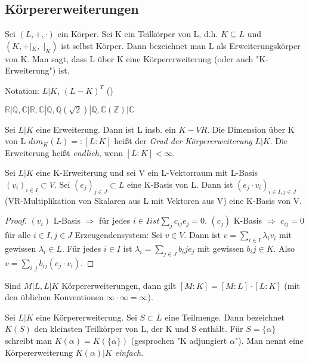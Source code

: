\documentclass[../main.tex]{subfiles}
\begin{document}
\subsection{Körpererweiterungen}
\begin{definition}[Körpererweiterung]
    Sei $(L, +, \cdot)$ ein Körper. Sei K ein Teilkörper von L, d.h. $K \subseteq L$ und $(K,+|_K,\cdot|_K)$ ist selbst Körper. Dann bezeichnet man L als Erweiterungskörper von K. Man sagt, dass L über K eine Körpererweiterung (oder auch "K-Erweiterung") ist. 

    Notation: $L | K$, $(L - K)^T$ ()
\end{definition}
\begin{example*} $\mathbb{R}|\mathbb{Q}, \mathbb{C}|\mathbb{R},\mathbb{C}|\mathbb{Q},\mathbb{Q}(\sqrt{2}) | \mathbb{Q}, \mathbb{C}(\mathbb{Z}) | \mathbb{C}$ \end{example*}
\begin{definition}
    Sei $L | K$ eine Erweiterung. Dann ist L insb. ein $K-VR$. Die Dimension über K von L $dim_K(L) =: [L:K]$ heißt der \emph{Grad der Körpererweiterung} $L | K$. Die Erweiterung heißt \emph{endlich}, wenn $[L:K] < \infty$.
\end{definition}
\begin{lemma}
    Sei $L | K$ eine K-Erweiterung und sei V ein L-Vektorraum mit L-Basis $(v_i)_{i \in I} \subset V$. Sei $(e_j)_{j \in J} \subset L$ eine K-Basis von L. Dann ist $(e_j \cdot v_i)_{i \in I, j \in J}$ (VR-Multiplikation von Skalaren aus L mit Vektoren aus V) eine K-Basis von V.
\end{lemma}
\begin{proof}
$(v_i)$ L-Basis $\Rightarrow$ für jedes $i \in I ist \sum_j c_{ij}e_j = 0$. $(c_j)$ K-Basis $\Rightarrow$ $c_{ij} = 0$ für alle $i \in I, j \in J$
Erzeugendensystem: Sei $v \in V$.
Dann ist $v = \sum_{i \in I} \lambda_iv_i$ mit gewissen $\lambda_i \in L$. Für jedes $i \in I$ ist $\lambda_i = \sum_{j \in J} b_ije_j$ mit gewissen $b_ij \in K$. Also $v = \sum_{i,j} b_{ij}(e_j \cdot v_i)$.
\end{proof}
\begin{lemma}[Korollar] \label{theo:2.12}
    Sind $M | L, L | K$ Körpererweiterungen, dann gilt $[M:K] = [M:L]\cdot[L:K]$ (mit den üblichen Konventionen $\infty \cdot \infty = \infty$).
\end{lemma}
\begin{definition}[Adjungieren]
    Sei $L | K$ eine Körpererweiterung. Sei $S \subset L$ eine Teilmenge. Dann bezeichnet $K(S)$ den kleinsten Teilkörper von L, der K und S enthält. Für $S=\{\alpha\}$ schreibt man $K(\alpha) = K(\{\alpha\})$ (gesprochen "K adjungiert $\alpha$"). Man nennt eine Körpererweiterung $K(\alpha) | K$ \emph{einfach}.
\end{definition}
\end{document}
